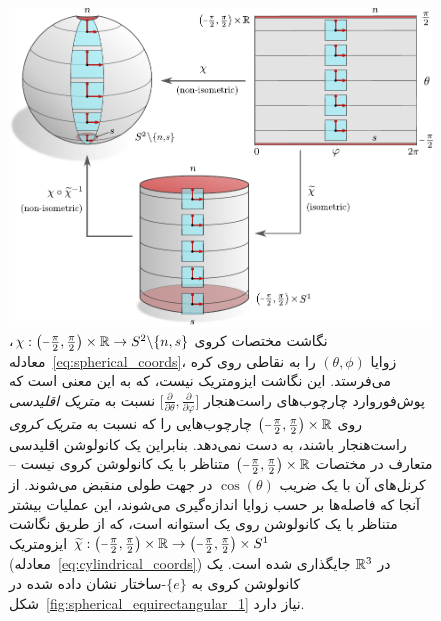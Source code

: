 \begin{figure}
    \centering
    \includegraphics[width=.90\textwidth]{figures/G_structure_spherical_equirectangular_2.pdf}
    \caption{\small
        نگاشت مختصات کروی
        $\chi: \big(\protect\minus\frac{\pi}{2}, \frac{\pi}{2}\big) \times \R \to S^2 \backslash \{n,s\}$، معادله~\eqref{eq:spherical_coords}، زوایا $(\theta,\phi)$ را به نقاطی روی کره می‌فرستد.
        این نگاشت ایزومتریک نیست، که به این معنی است که پوش‌فوروارد چارچوب‌های راست‌هنجار
        $\big[ \frac{\partial}{\partial\theta}, \frac{\partial}{\partial\varphi} \big]$
        نسبت به \emph{متریک اقلیدسی} روی $\big(\protect\minus\frac{\pi}{2}, \frac{\pi}{2}\big) \times \R$ چارچوب‌هایی را که نسبت به \emph{متریک کروی} راست‌هنجار باشند، به دست نمی‌دهد.
        بنابراین یک کانولوشن اقلیدسی متعارف در مختصات $\big(\protect\minus\frac{\pi}{2}, \frac{\pi}{2}\big) \times \R$ متناظر با یک کانولوشن کروی نیست -- کرنل‌های آن با یک ضریب $\cos(\theta)$ در جهت طولی منقبض می‌شوند.
        از آنجا که فاصله‌ها بر حسب زوایا اندازه‌گیری می‌شوند، این عملیات بیشتر متناظر با یک کانولوشن روی یک استوانه است، که از طریق نگاشت ایزومتریک
        $\widetilde{\chi}: \big( {\textstyle \protect\minus\frac{\pi}{2}, \frac{\pi}{2}} \big) \times \R
        \to \big( {\textstyle \protect\minus\frac{\pi}{2}, \frac{\pi}{2}} \big) \times S^1$
        (معادله~\eqref{eq:cylindrical_coords}) در $\mathbb{R}^3$ جایگذاری شده است.
        یک کانولوشن کروی به $\{e\}$-ساختار نشان داده شده در شکل~\ref{fig:spherical_equirectangular_1} نیاز دارد.
    }
    \label{fig:spherical_equirectangular_2}
\end{figure}


